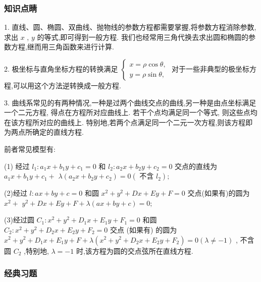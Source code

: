 \subsubsection*{知识点睛}

1. 直线、圆、椭圆、双曲线、抛物线的参数方程都需要掌握,将参数方程消除参数,求出 $x$ , $y$ 的等式,即可得到一般方程. 我们也经常用三角代换去求出圆和椭圆的参数方程,继而用三角函数来进行计算.

2. 极坐标与直角坐标方程的转换满足 $\left\{  \begin{array}{l} x = \rho \cos \theta , \\  y = \rho \sin \theta , \end{array}\right.$ 对于一些非典型的极坐标方程,可以用这个方法逆转换成一般方程.

3. 曲线系常见的有两种情况,一种是过两个曲线交点的曲线,另一种是由点坐标满足一个二元方程, 得点在方程所对应曲线上. 若干个点均满足同一个等式, 则这些点均在该方程所对应的曲线上. 特别地,若两个点满足同一个二元一次方程,则该方程即为两点所确定的直线方程.

前者常见模型有:

(1) 经过 ${l}_{1} : {a}_{1}x + {b}_{1}y + {c}_{1} = 0$ 和 ${l}_{2} : {a}_{2}x + {b}_{2}y + {c}_{2} = 0$ 交点的直线为 ${a}_{1}x + {b}_{1}y + {c}_{1} +$  $\lambda \left( {{a}_{2}x + {b}_{2}y + {c}_{2}}\right)  = 0\left( {\text{ 不含 }{l}_{2}}\right) ;$

(2)经过 $l : {ax} + {by} + c = 0$ 和圆 ${x}^{2} + {y}^{2} + {Dx} + {Ey} + F = 0$ 交点(如果有)的圆为 ${x}^{2} +$  ${y}^{2} + {Dx} + {Ey} + F + \lambda \left( {{ax} + {by} + c}\right)  = 0;$

(3)经过圆 ${C}_{1} : {x}^{2} + {y}^{2} + {D}_{1}x + {E}_{1}y + {F}_{1} = 0$ 和圆 ${C}_{2} : {x}^{2} + {y}^{2} + {D}_{2}x + {E}_{2}y + {F}_{2} = 0$ 交点 (如果有) 的圆为 ${x}^{2} + {y}^{2} + {D}_{1}x + {E}_{1}y + F + \lambda \left( {{x}^{2} + {y}^{2} + {D}_{2}x + {E}_{2}y + {F}_{2}}\right)  = 0\left( {\lambda  \neq   - 1}\right)$ , 不含圆 ${C}_{2}$ ,特别地, $\lambda  =  - 1$ 时,该方程为圆的交点弦所在直线方程.

\subsubsection*{经典习题}

